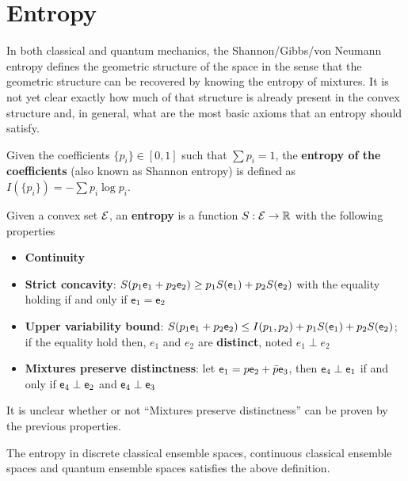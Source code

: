 \section{Entropy}

In both classical and quantum mechanics, the Shannon/Gibbs/von Neumann entropy defines the geometric structure of the space in the sense that the geometric structure can be recovered by knowing the entropy of mixtures. It is not yet clear exactly how much of that structure is already present in the convex structure and, in general, what are the most basic axioms that an entropy should satisfy.

\begin{defn}
	Given the coefficients $\{p_i\} \in [0,1]$ such that $\sum p_i = 1$, the \textbf{entropy of the coefficients} (also known as Shannon entropy) is defined as $I(\{p_i\}) = - \sum p_i \log p_i $.
\end{defn}

\begin{defn}
	Given a convex set $\mathcal{E}$, an \textbf{entropy} is a function $S : \mathcal{E} \to \mathbb{R}$ with the following properties
	\begin{itemize}
		\item \textbf{Continuity}
		\item \textbf{Strict concavity}: $S(p_1\mathsf{e}_1 + p_2 \mathsf{e}_2) \geq p_1 S(\mathsf{e}_1) + p_2 S(\mathsf{e}_2)$ with the equality holding if and only if $\mathsf{e}_1 = \mathsf{e}_2$
		\item \textbf{Upper variability bound}: $S(p_1\mathsf{e}_1 + p_2 \mathsf{e}_2) \leq I(p_1, p_2) + p_1 S(\mathsf{e}_1) + p_2 S(\mathsf{e}_2)$; if the equality hold then, $e_1$ and $e_2$ are \textbf{distinct}, noted $e_1 \perp e_2$
		\item \textbf{Mixtures preserve distinctness}: let $\mathsf{e}_1 = p \mathsf{e}_2 + \bar{p} \mathsf{e}_3$, then $\mathsf{e}_4 \perp \mathsf{e}_1$ if and only if $\mathsf{e}_4 \perp \mathsf{e}_2$ and $\mathsf{e}_4 \perp \mathsf{e}_3$
	\end{itemize}
\end{defn}

\begin{remark}
	It is unclear whether or not ``Mixtures preserve distinctness'' can be proven by the previous properties.
\end{remark}

\begin{prop}
	The entropy in discrete classical ensemble spaces, continuous classical ensemble spaces and quantum ensemble spaces satisfies the above definition.
\end{prop}

